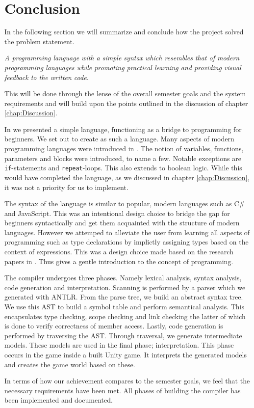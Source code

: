 \chapter{Conclusion}\label{chap:conclusion}

In the following section we will summarize and conclude how the project solved the problem statement.

\vspace{5mm}
\textit{A programming language with a simple syntax which resembles that of modern programming languages while promoting practical learning and providing visual feedback to the written code.}
\vspace{5mm}

This will be done through the lense of the overall semester goals and the system requirements and will build upon the points outlined in the discussion of chapter \ref{chap:Discussion}.

In  we presented a simple language, functioning as a bridge to programming for beginners. We set out to create \dazel{} as such a language.
Many aspects of modern programming languages were introduced in \dazel{}. The notion of variables, functions, parameters and blocks were introduced, to name a few. Notable exceptions are \texttt{if}-statements and \texttt{repeat}-loops. This also extends to boolean logic. While this would have completed the language, as we discussed in chapter \ref{chap:Discussion}, it was not a priority for us to implement. 

The syntax of the language is similar to popular, modern languages such as C\# and JavaScript.
This was an intentional design choice to bridge the gap for beginners syntactically and get them acquainted with the structure of modern languages. 
However we attemped to alleviate the user from learning all aspects of programming such as type declarations by implictly assigning types based on the context of expressions. 
This was a design choice made based on the research papers in . 
Thus \dazel{} gives a gentle introduction to the concept of programming.

The \dazel{} compiler undergoes three phases. Namely lexical analysis, syntax analysis, code generation and interpretation. Scanning is performed by a parser which we generated with ANTLR. From the parse tree, we build an abstract syntax tree. We use this AST to build a symbol table and perform semantical analysis. This encapsulates type checking, scope checking and link checking the latter of which is done to verify correctness of member access. Lastly, code generation is performed by traversing the AST. Through traversal, we generate intermediate models. These models are used in the final phase; interpretation. This phase occurs in the \dazel{} game inside a built Unity game. It interprets the generated models and creates the game world based on these.

In terms of how our achievement compares to the semester goals, we feel that the necessary requirements have been met. All phases of building the compiler has been implemented and documented.